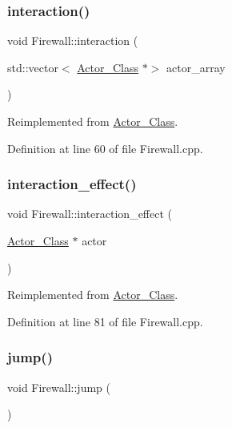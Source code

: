 \subsubsection{\texorpdfstring{interaction()}{interaction()}}
{\footnotesize\ttfamily void Firewall\+::interaction (\begin{DoxyParamCaption}\item[{std\+::vector$<$ \hyperlink{class_actor___class}{Actor\+\_\+\+Class} $\ast$$>$}]{actor\+\_\+array }\end{DoxyParamCaption})\hspace{0.3cm}{\ttfamily [virtual]}}



Reimplemented from \hyperlink{class_actor___class_a87d1e079d8576fa99592a60b38a04a1b}{Actor\+\_\+\+Class}.



Definition at line 60 of file Firewall.\+cpp.

\hypertarget{class_firewall_a035dac1c484fe153ca14710777c617cb}{}\label{class_firewall_a035dac1c484fe153ca14710777c617cb} 
\subsubsection{\texorpdfstring{interaction\+\_\+effect()}{interaction\_effect()}}
{\footnotesize\ttfamily void Firewall\+::interaction\+\_\+effect (\begin{DoxyParamCaption}\item[{\hyperlink{class_actor___class}{Actor\+\_\+\+Class} $\ast$}]{actor }\end{DoxyParamCaption})\hspace{0.3cm}{\ttfamily [virtual]}}



Reimplemented from \hyperlink{class_actor___class_af3488ca470eb77255060142fd167aa72}{Actor\+\_\+\+Class}.



Definition at line 81 of file Firewall.\+cpp.

\hypertarget{class_firewall_a6fd8ce6bf5731d822c0d47ee209dbe8d}{}\label{class_firewall_a6fd8ce6bf5731d822c0d47ee209dbe8d} 
\subsubsection{\texorpdfstring{jump()}{jump()}}
{\footnotesize\ttfamily void Firewall\+::jump (\begin{DoxyParamCaption}{ }\end{DoxyParamCaption})\hspace{0.3cm}{\ttfamily [virtual]}}



